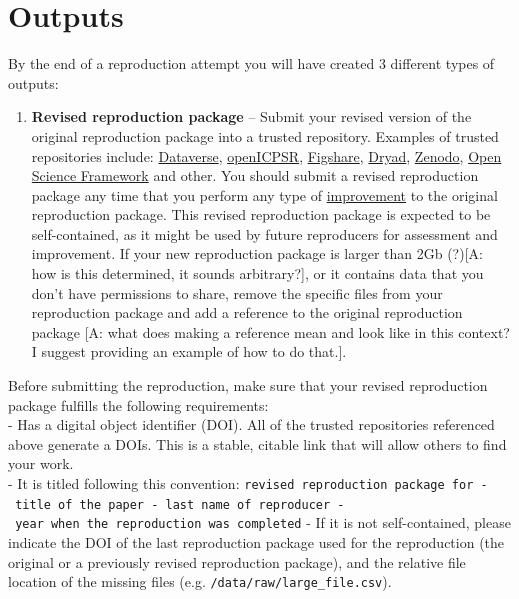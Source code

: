 \documentclass[]{book}
\providecommand{\tightlist}{%
  \setlength{\itemsep}{0pt}\setlength{\parskip}{0pt}}
\begin{document}
\hypertarget{outputs}{%
\section{Outputs}\label{outputs}}

By the end of a reproduction attempt you will have created 3 different types of outputs:

\begin{enumerate}
\def\labelenumi{\arabic{enumi}.}
\tightlist
\item
  \textbf{Revised reproduction package} -- Submit your revised version of the original reproduction package into a trusted repository. Examples of trusted repositories include: \href{https://dataverse.org/}{Dataverse}, \href{https://www.openicpsr.org/openicpsr/}{openICPSR}, \href{https://figshare.com}{Figshare}, \href{https://datadryad.org/stash}{Dryad}, \href{https://about.zenodo.org/}{Zenodo}, \href{osf.io/}{Open Science Framework} and other. You should submit a revised reproduction package any time that you perform any type of \protect\hyperlink{improvements}{improvement} to the original reproduction package. This revised reproduction package is expected to be self-contained, as it might be used by future reproducers for assessment and improvement. If your new reproduction package is larger than 2Gb (?){[}A: how is this determined, it sounds arbitrary?{]}, or it contains data that you don't have permissions to share, remove the specific files from your reproduction package and add a reference to the original reproduction package {[}A: what does making a reference mean and look like in this context? I suggest providing an example of how to do that.{]}.
\end{enumerate}

Before submitting the reproduction, make sure that your revised reproduction package fulfills the following requirements:\\
- Has a digital object identifier (DOI). All of the trusted repositories referenced above generate a DOIs. This is a stable, citable link that will allow others to find your work.\\
- It is titled following this convention: \texttt{revised\ reproduction\ package\ for\ -\ title\ of\ the\ paper\ -\ last\ name\ of\ reproducer\ -\ year\ when\ the\ reproduction\ was\ completed}
- If it is not self-contained, please indicate the DOI of the last reproduction package used for the reproduction (the original or a previously revised reproduction package), and the relative file location of the missing files (e.g. \texttt{/data/raw/large\_file.csv}).
\end{document}
